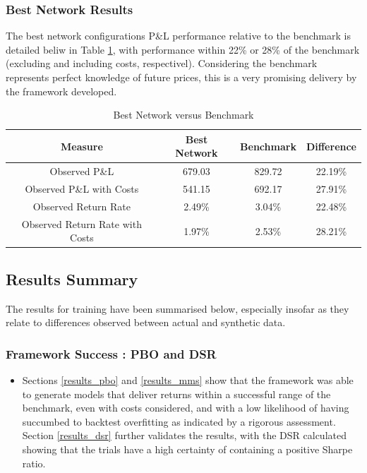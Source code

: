 \documentclass[a4paper,11pt,oneside]{article}
\theoremstyle{plain}
\theoremstyle{definition}
\begin{document}
	\subsubsection{Best Network Results}
	
	The best network configurations P\&L performance relative to the benchmark is detailed beliw in Table \ref{table_best_network}, with performance within 22\% or 28\% of the benchmark (excluding and including costs, respectivel). Considering the benchmark represents perfect knowledge of future prices, this is a very promising delivery by the framework developed.
	
	\begin{table}[H]
		\centering
		\begin{tabular}{|c|c|c|c|}
			\hline
			\textbf{Measure} &\textbf{Best Network} & \textbf{Benchmark} & \textbf{Difference}\\\hline	
			{Observed P\&L} & {679.03} & {829.72} & {22.19\%} \\\hline
			{Observed P\&L with Costs} & {541.15} & {692.17} & {27.91\%} \\\hline
			{Observed Return Rate} & {2.49\%} & {3.04\%} & {22.48\%} \\\hline
			{Observed Return Rate with Costs} & {1.97\%} & {2.53\%} & {28.21\%} \\\hline
		\end{tabular}
		\newline\newline
		\caption{Best Network versus Benchmark}\label{tab_bestvsbenchmark}
		\label{table_best_network}
	\end{table}
	
	
	
	
	\newpage
	\subsection{Results Summary}\label{results_summary}
	
	The results for training have been summarised below, especially insofar as they relate to differences observed between actual and synthetic data.
	
	\subsubsection{Framework Success : PBO and DSR}
	\begin{itemize}
		\item[1] Sections \ref{results_pbo} and \ref{results_mms} show that the framework was able to generate models that deliver returns within a successful range of the benchmark, even with costs considered, and with a low likelihood of having succumbed to backtest overfitting as indicated by a rigorous assessment. Section \ref{results_dsr} further validates the results, with the DSR calculated showing that the trials have a high certainty of containing a positive Sharpe ratio.
	\end{itemize}
	
\end{document}

